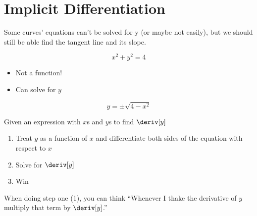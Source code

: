 
\section{Implicit Differentiation}
Some curves' equations can't be solved for y (or maybe not easily), but we should still be able find the tangent line and its slope.
\begin{example}
    \begin{equation*}
        x^2 + y^2 = 4
    \end{equation*}
    \begin{itemize}
        \item Not a function!
        \item Can solve for $y$
    \end{itemize}
    \begin{equation*}
        y = \pm \sqrt{4 - x^2}
    \end{equation*}
    Given an expression with $x$s and $y$s to find $\deriv[y]$
    \begin{enumerate}
        \item Treat $y$ as a function of $x$ and differentiate both sides of the equation with respect to $x$
        \item Solve for $\deriv[y]$
        \item Win
    \end{enumerate}
\end{example}
\begin{note}
    When doing step one (1), you can think ``Whenever I thake the derivative of $y$ multiply that term by $\deriv[y]$.''
\end{note}
